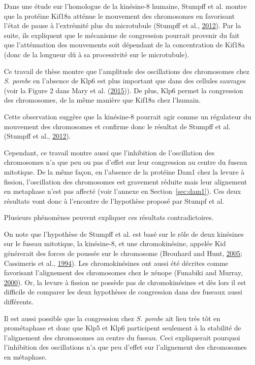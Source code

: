 \documentclass[12pt,a4paper,twoside,openright]{book}
\begin{document}
Dans une étude sur l'homologue de la kinésine-8 humaine, Stumpff et al.
montre que la protéine Kif18a atténue le mouvement des chromosomes en
favorisant l'état de pause à l'extrémité plus du microtubule (Stumpff et
al., \protect\hyperlink{ref-Stumpff2012}{2012}). Par la suite, ils
expliquent que le mécanisme de congression pourrait provenir du fait que
l'atténuation des mouvements soit dépendant de la concentration de
Kif18a (donc de la longueur dû à sa processivité sur le microtubule).

Ce travail de thèse montre que l'amplitude des oscillations des
chromosomes chez \emph{S. pombe} en l'absence de Klp6 est plus important
que dans des cellules sauvages (voir la Figure 2 dans Mary et al.
(\protect\hyperlink{ref-Mary2015}{2015})). De plus, Klp6 permet la
congression des chromosomes, de la même manière que Kif18a chez
l'humain.

Cette observation suggère que la kinésine-8 pourrait agir comme un
régulateur du mouvement des chromosomes et confirme donc le résultat de
Stumpff et al. (Stumpff et al.,
\protect\hyperlink{ref-Stumpff2012}{2012}).

Cependant, ce travail montre aussi que l'inhibition de l'oscillation des
chromosomes n'a que peu ou pas d'effet sur leur congression au centre du
fuseau mitotique. De la même façon, en l'absence de la protéine Dam1
chez la levure à fission, l'oscillation des chromosomes est gravement
réduite mais leur alignement en metaphase n'est pas affecté (voir
l'annexe en Section~\ref{sec:dam1}). Ces deux résultats vont donc à
l'encontre de l'hypothèse proposé par Stumpf et al.

Plusieurs phénomènes peuvent expliquer ces résultats contradictoires.

On note que l'hypothèse de Stumpff et al. est basé sur le rôle de deux
kinésines sur le fuseau mitotique, la kinésine-8, et une chromokinésine,
appelée Kid générerait des forces de poussée sur le chromosome (Brouhard
and Hunt, \protect\hyperlink{ref-Brouhard2005}{2005}; Cassimeris et al.,
\protect\hyperlink{ref-Cassimeris1994}{1994}). Les chromokinésines ont
aussi été décrites comme favorisant l'alignement des chromosomes chez le
xénope (Funabiki and Murray,
\protect\hyperlink{ref-Funabiki2000}{2000}). Or, la levure à fission ne
possède pas de chromokinésines et dès lors il est difficile de comparer
les deux hypothèses de congression dans des fuseaux aussi différents.

Il est aussi possible que la congression chez \emph{S. pombe} ait lieu
très tôt en prométaphase et donc que Klp5 et Klp6 participent seulement
à la stabilité de l'alignement des chromosomes au centre du fuseau. Ceci
expliquerait pourquoi l'inhibition des oscillations n'a que peu d'effet
sur l'alignement des chromosomes en métaphase.
\end{document}
